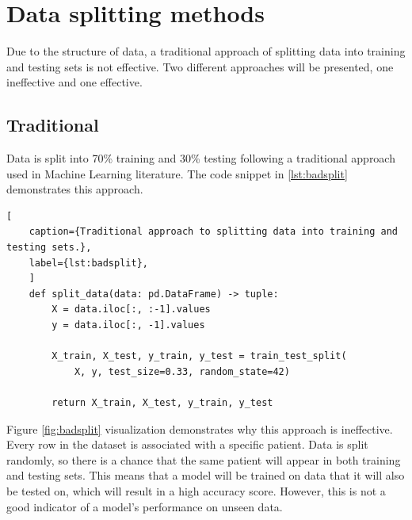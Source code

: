     \newpage
        
        
    \section{Data splitting methods}
        
            Due to the structure of data, a traditional approach of splitting data into training and testing sets is not effective. Two different approaches will be presented, one ineffective and one effective.

            \subsection{Traditional} \label{sec:badsplit}
                        
                    Data is split into 70\% training and 30\% testing following a traditional approach used in Machine Learning literature. The code snippet in \ref{lst:badsplit} demonstrates this approach. 
            
\begin{lstlisting}[
    caption={Traditional approach to splitting data into training and testing sets.}, 
    label={lst:badsplit},
    ]            
    def split_data(data: pd.DataFrame) -> tuple:        
        X = data.iloc[:, :-1].values
        y = data.iloc[:, -1].values
        
        X_train, X_test, y_train, y_test = train_test_split(
            X, y, test_size=0.33, random_state=42)
        
        return X_train, X_test, y_train, y_test
\end{lstlisting}
                
                    Figure \ref{fig:badsplit} visualization demonstrates why this approach is ineffective. Every row in the dataset is associated with a specific patient. Data is split randomly, so there is a chance that the same patient will appear in both training and testing sets. This means that a model will be trained on data that it will also be tested on, which will result in a high accuracy score. However, this is not a good indicator of a model's performance on unseen data.

